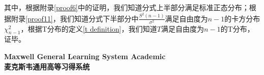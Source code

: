 \documentclass[UTF8]{ctexbook}
\begin{document}
其中，根据附录\ref{proof6}中的证明，我们知道分式上半部分满足标准正态分布；根据附录\ref{proof11}，我们知道分式下半部分中$\frac{S^2(n-1)}{\sigma^2}$满足自由度为$n-1$的卡方分布$\chi_{n-1}^2$，根据T分布的定义\ref{t definition}，我们知道$T$满足自由度为$n-1$的T分布，证毕。


\vfill
\noindent \textbf{Maxwell General Learning System Academic}\\
\textbf{麦克斯韦通用高等习得系统}\\
\end{document}

